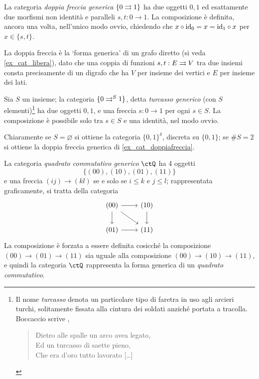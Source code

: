 \begin{example}\label{ex_cat_doppiafreccia}
	La categoria \emph{doppia freccia generica} \(\{0\rightrightarrows 1\}\) ha due oggetti \(0,1\) ed esattamente due morfismi non identità e paralleli \(s,t : 0\to 1\). La composizione è definita, ancora una volta, nell'unico modo ovvio, chiedendo che \(x\circ \mathrm{id}_0=x=\mathrm{id}_1\circ x\) per \(x\in\{s,t\}\).

	La doppia freccia è la `forma generica' di un grafo diretto (si veda \ref{ex_cat_libera}), dato che una coppia di funzioni \(s,t: E \rightrightarrows V\) tra due insiemi consta precisamente di un digrafo che ha \(V\) per insieme dei vertici e \(E\) per insieme dei lati.
\end{example}
\begin{example}\label{ex_cat_turcasso}
	Sia \(S\) un insieme; la categoria \(\turk\), detta \emph{turcasso generico} (con \(S\) elementi)\footnote{Il nome \emph{turcasso} denota un particolare tipo di faretra in uso agli arcieri turchi, solitamente fissata alla cintura dei soldati anziché portata a tracolla. Boccaccio scrive \cite{boccaccio1831teseide},
		\begin{verse}
			Dietro alle spalle un arco avea legato,\\
			Ed un turcasso di saette pieno,\\
			Che era d'oro tutto lavorato [\dots\unkern]
		\end{verse}} ha due oggetti \(0,1\), e una freccia \(s : 0\to 1\) per ogni \(s\in S\). La composizione è possibile solo tra \(s\in S\) e una identità, nel modo ovvio.

	Chiaramente se \(S=\varnothing\) si ottiene la categoria \(\{0,1\}^\delta\), discreta su \(\{0,1\}\); se \(\#S=2\) si ottiene la doppia freccia generica di \ref{ex_cat_doppiafreccia}.
\end{example}
\begin{example}\label{ex_quadcuboncubo}
	La categoria \emph{quadrato commutativo generico} \(\ctQ\) ha 4 oggetti
	\[\{(00),(10),(01),(11)\} \]
	e una freccia \((ij)\to(kl)\) se e solo se \(i\le k\) e \(j\le l\); rappresentata graficamente, si tratta della categoria
	\[\begin{tikzcd}
			(00) \ar[r]\ar[d]\ar[dr]& (10)\ar[d] \\
			(01) \ar[r]& (11)
		\end{tikzcd}\]
	La composizione è forzata a essere definita cosicché la composizione \((00)\to (01)\to (11)\) sia uguale alla composizione \((00)\to (10)\to (11)\), e quindi la categoria \(\ctQ\) rappresenta la forma generica di un \emph{quadrato commutativo}.
\end{example}
